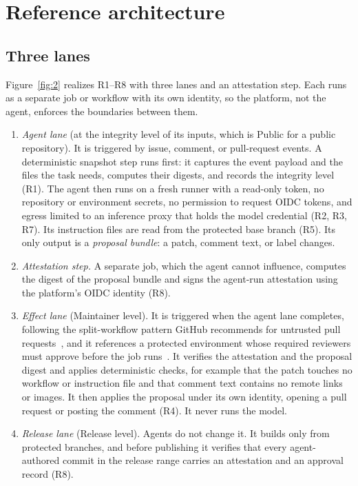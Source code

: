 \documentclass[acmsmall,screen,review]{acmart}
\begin{document}
\section{Reference architecture}\label{sec:7}


\subsection{Three lanes}\label{sec:7.1}

Figure~\ref{fig:2} realizes R1–R8 with three lanes and an attestation step. Each runs as a separate job or workflow with its own identity, so the platform, not the agent, enforces the boundaries between them.

\begin{enumerate}
\item \emph{Agent lane} (at the integrity level of its inputs, which is Public for a public repository). It is triggered by issue, comment, or pull-request events. A deterministic snapshot step runs first: it captures the event payload and the files the task needs, computes their digests, and records the integrity level (R1). The agent then runs on a fresh runner with a read-only token, no repository or environment secrets, no permission to request OIDC tokens, and egress limited to an inference proxy that holds the model credential (R2, R3, R7). Its instruction files are read from the protected base branch (R5). Its only output is a \emph{proposal bundle}: a patch, comment text, or label changes.
\item \emph{Attestation step.} A separate job, which the agent cannot influence, computes the digest of the proposal bundle and signs the agent-run attestation using the platform's OIDC identity (R8).
\item \emph{Effect lane} (Maintainer level). It is triggered when the agent lane completes, following the split-workflow pattern GitHub recommends for untrusted pull requests~\cite{lobavcevski2021keeping}, and it references a protected environment whose required reviewers must approve before the job runs~\cite{githubnddeployments}. It verifies the attestation and the proposal digest and applies deterministic checks, for example that the patch touches no workflow or instruction file and that comment text contains no remote links or images. It then applies the proposal under its own identity, opening a pull request or posting the comment (R4). It never runs the model.
\item \emph{Release lane} (Release level). Agents do not change it. It builds only from protected branches, and before publishing it verifies that every agent-authored commit in the release range carries an attestation and an approval record (R8).
\end{enumerate}
\end{document}
